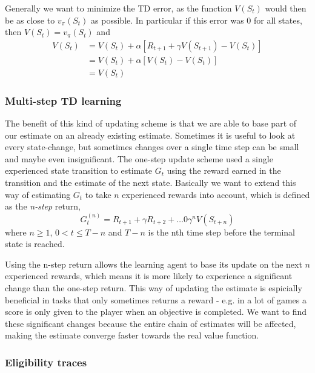 \documentclass[11pt]{article}
\begin{document}
Generally we want to minimize the TD error, as the function $V(S_t)$
would then be as close to $v_\pi(S_t)$ as possible.
In particular if this error was 0 for all states, then
$V(S_t) = v_\pi(S_t)$ and
\begin{align}
   V(S_t)  & = V(S_t) + \alpha  [R_{t+1} + \gamma  V(S_{t+1}) - V(S_t)]   \\
           & = V(S_t) + \alpha  [V(S_t) - V(S_t)]  \\
           & = V(S_t) 
\end{align}

\subsubsection{Multi-step TD learning}

The benefit of this kind of updating scheme is that we are able to base
part of our estimate on an already existing estimate.
Sometimes it is useful to look at every state-change, but sometimes
changes over a single time step can be small and maybe even insignificant.
The one-step update scheme used a single experienced state transition to estimate
$G_t$ using the reward earned in the transition and the estimate of the
next state.
Basically we want to extend this way of estimating $G_t$ to take $n$ experienced rewards
into account, which is defined as the \textit{n-step} return,
\begin{equation}
    G^{(n)}_t = R_{t+1} + \gamma R_{t+2} + \dots 0 \gamma^n V(S_{t+n})
\end{equation}
where $n \geq 1$, $0 < t \leq T - n$ and $T - n$ is the nth time step before the terminal state
is reached.

Using the n-step return allows the learning agent to base its update on the next $n$ experienced
rewards, which means it is more likely to experience a significant change than the one-step return.
This way of updating the estimate is espicially beneficial in tasks that only sometimes returns a reward
- e.g. in a lot of games a score is only given to the player when an objective is completed.
We want to find these significant changes because the entire chain of estimates 
will be affected, making the estimate converge faster towards the real value function.

\subsubsection{Eligibility traces}
\end{document}
